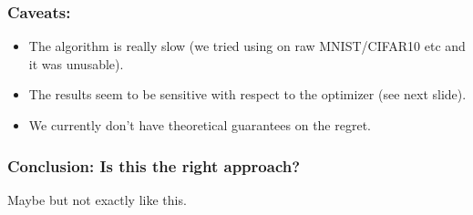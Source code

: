 \documentclass{beamer}
\begin{document}
\begin{frame}{}
    \frametitle{Caveats:}
    \begin{itemize}
        \item The algorithm is really slow (we tried using on raw MNIST/CIFAR10 etc and it was unusable).
        \item The results seem to be sensitive with respect to the optimizer (see next slide).
        \item We currently don't have theoretical guarantees on the regret.
    \end{itemize}
\end{frame}

\begin{frame}{}
    \frametitle{Conclusion: Is this the right approach?}
    Maybe but not exactly like this.
\end{frame}
\end{document}
